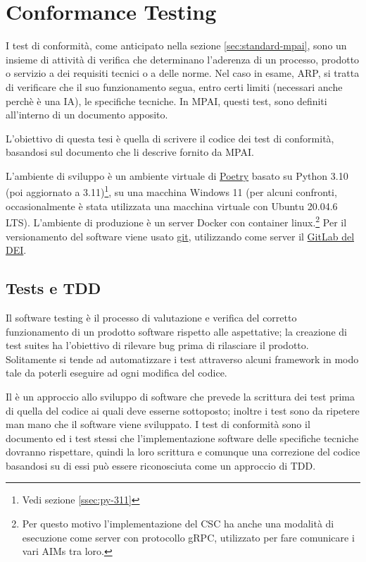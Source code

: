 
\chapter{Conformance Testing} \label{chp:conformancetesting}    %
I test di conformità, come anticipato nella sezione \ref{sec:standard-mpai}, sono un insieme di attività di verifica che determinano l'aderenza di un processo, prodotto o servizio a dei requisiti tecnici o a delle norme.
Nel caso in esame, \ac{ARP}, si tratta di verificare che il suo funzionamento segua, entro certi limiti (necessari anche perchè è una IA), le specifiche tecniche. In \ac{MPAI}, questi test, sono definiti all'interno di un documento apposito.

L'obiettivo di questa tesi è quella di scrivere il codice dei test di conformità, basandosi sul documento che li descrive fornito da MPAI.

L'ambiente di sviluppo è un ambiente virtuale di \href{https://python-poetry.org/}{Poetry} basato su Python 3.10 (poi aggiornato a 3.11)\footnote{Vedi sezione \ref{ssec:py-311}}, su una macchina Windows 11 (per alcuni confronti, occasionalmente è stata utilizzata una macchina virtuale con Ubuntu 20.04.6 LTS). L'ambiente di produzione è un server Docker con container linux.\footnote{Per questo motivo l'implementazione del CSC ha anche una modalità di esecuzione come server con protocollo gRPC, utilizzato per fare comunicare i vari \acp{AIM} tra loro.} Per il versionamento del software viene usato \href{https://git-scm.com/}{git}, utilizzando come server il \href{https://gitlab.dei.unipd.it/}{GitLab del \ac{DEI}}.


\section{Tests e \acl{TDD}} \label{sec:tests-tdd}
Il software testing è il processo di valutazione e verifica del corretto funzionamento di un prodotto software rispetto alle aspettative; la creazione di test suites ha l'obiettivo di rilevare bug prima di rilasciare il prodotto.
Solitamente si tende ad automatizzare i test attraverso alcuni framework in modo tale da poterli eseguire ad ogni modifica del codice.

Il  è un approccio allo sviluppo di software che prevede la scrittura dei test prima di quella del codice ai quali deve esserne sottoposto; inoltre i test sono da ripetere man mano che il software viene sviluppato.
I test di conformità sono il documento ed i test stessi che l'implementazione software delle specifiche tecniche dovranno rispettare, quindi la loro scrittura e comunque una correzione del codice basandosi su di essi può essere riconosciuta come un approccio di \ac{TDD}. %



